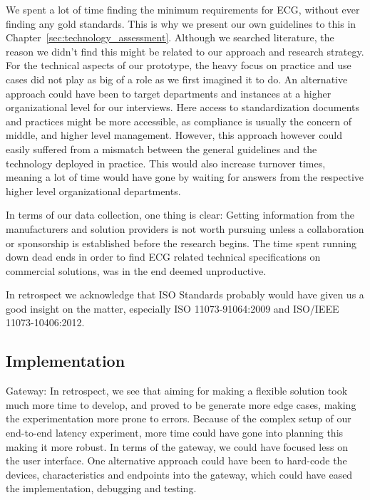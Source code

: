 We spent a lot of time finding the minimum requirements for ECG, without ever finding any gold standards. This is why we present our own guidelines to this in Chapter~\ref{sec:technology_assessment}. Although we searched literature, the reason we didn't find this might be related to our approach and research strategy. For the technical aspects of our prototype, the heavy focus on practice and use cases did not play as big of a role as we first imagined it to do. An alternative approach could have been to target departments and instances at a higher organizational level for our interviews. Here access to standardization documents and practices might be more accessible, as compliance is usually the concern of middle, and higher level management. However, this approach however could easily suffered from a mismatch between the general guidelines and the technology deployed in practice. This would also increase turnover times, meaning a lot of time would have gone by waiting for answers from the respective higher level organizational departments.

In terms of our data collection, one thing is clear: Getting information from the manufacturers and solution providers is not worth pursuing unless a collaboration or sponsorship is established before the research begins. The time spent running down dead ends in order to find ECG related technical specifications on commercial solutions, was in the end deemed unproductive.

In retrospect we acknowledge that ISO Standards probably would have given us a good insight on the matter, especially ISO 11073-91064:2009 and ISO/IEEE 11073-10406:2012.



\subsection{Implementation} %
\label{sub:implementation}


Gateway: In retrospect, we see that aiming for making a flexible solution took much more time to develop, and proved to be generate more edge cases, making the experimentation more prone to errors. Because of the complex setup of our end-to-end latency experiment, more time could have gone into planning this making it more robust. In terms of the gateway, we could have focused less on the user interface. One alternative approach could have been to hard-code the devices, characteristics and endpoints into the gateway, which could have eased the implementation, debugging and testing. 

